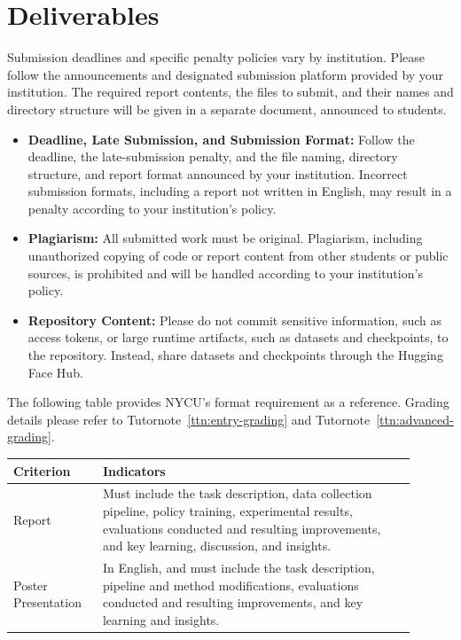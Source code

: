\documentclass[11pt]{article}
\begin{document}
\section{Deliverables}

Submission deadlines and specific penalty policies vary by institution. Please follow the announcements and designated submission platform provided by your institution. The required report contents, the files to submit, and their names and directory structure will be given in a separate document, announced to students.

\begin{itemize}
    \item \textbf{Deadline, Late Submission, and Submission Format: }
    Follow the deadline, the late-submission penalty, and the file naming, directory structure, and report format announced by your institution. Incorrect submission formats, including a report not written in English, may result in a penalty according to your institution's policy.

    \item \textbf{Plagiarism: }
    All submitted work must be original. Plagiarism, including unauthorized copying of code or report content from other students or public sources, is prohibited and will be handled according to your institution's policy.

    \item \textbf{Repository Content: }
    Please do not commit sensitive information, such as access tokens, or large runtime artifacts, such as datasets and checkpoints, to the repository. Instead, share datasets and checkpoints through the Hugging Face Hub.
\end{itemize}


\begin{tutornote}
The following table provides NYCU's format requirement as a reference. Grading details please refer to Tutornote~\ref{ttn:entry-grading} and Tutornote~\ref{ttn:advanced-grading}.
\begin{longtable}{p{0.2\linewidth}p{0.7\linewidth}}
\toprule
\textbf{Criterion} & \textbf{Indicators} \\
\midrule
Report & Must include the task description, data collection pipeline, policy training, experimental results, evaluations conducted and resulting improvements, and key learning, discussion, and insights. \\
Poster Presentation & In English, and must include the task description, pipeline and method modifications, evaluations conducted and resulting improvements, and key learning and insights. \\
\bottomrule
\end{longtable}
\end{tutornote}


\printbibliography[heading=bibintoc]
\end{document}
